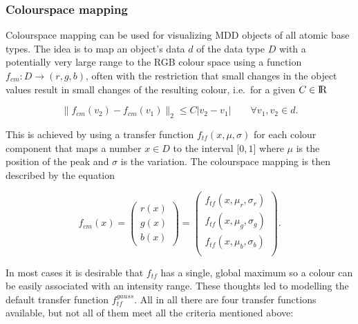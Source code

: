 \documentclass[11pt]{article}
\begin{document}
\subsubsection{Colourspace mapping}
\label{ColourspaceMapping}

Colourspace mapping can be used for visualizing MDD objects of all atomic base types.
The idea is to map an object's data $d$ of the data type $D$ with a potentially very
large range to the RGB colour space using a function $f_{cm}: D \rightarrow (r,g,b)$,
often with the restriction that small changes in the object values result in small
changes of the resulting colour, i.e.\ for a given $C \in \mbox{I}\!\mbox{R}$

$$\| f_{cm}(v_2) - f_{cm}(v_1) \|_2 \le C \vert v_2 - v_1 \vert \qquad \forall v_1, v_2 \in d .$$

This is achieved by using a transfer function $f_{tf}(x, \mu, \sigma)$ for each colour component
that maps a number $x \in D$ to the interval $\lbrack 0, 1 \rbrack$ where $\mu$ is the
position of the peak and $\sigma$ is the variation. The colourspace mapping is then
described by the equation

\begin{displaymath}
f_{cm}(x) =
\left( \begin{array}{c}
r(x) \\ g(x) \\ b(x)
\end{array} \right)
=
\left( \begin{array}{c}
f_{tf}(x, \mu_r, \sigma_r) \\
f_{tf}(x, \mu_g, \sigma_g) \\
f_{tf}(x, \mu_b, \sigma_b) \\
\end{array} \right) .
\end{displaymath}

In most cases it is desirable that $f_{tf}$ has a single, global maximum so a colour can
be easily associated with an intensity range. These thoughts led to modelling the default
transfer function $f^{gauss}_{tf}$. All in all there are four transfer functions available,
but not all of them meet all the criteria mentioned above:
\end{document}

